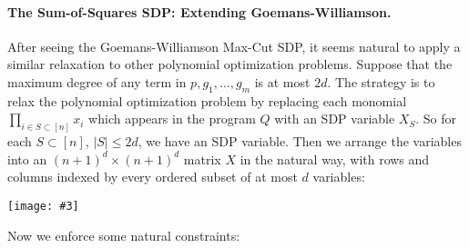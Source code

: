\documentclass[a4paper,11pt]{article}
\theoremstyle{definition}
\def\image#1#2#3{\begin{center}\texttt{[image: \#3]}\end{center}}
\begin{document}
\paragraph{The Sum-of-Squares SDP: Extending Goemans-Williamson.}
After seeing the Goemans-Williamson Max-Cut SDP, it seems natural to apply a similar relaxation to other polynomial optimization problems.
Suppose that the maximum degree of any term in $p, g_1,\ldots,g_m$ is at most $2d$.
The strategy is to relax the polynomial optimization problem by replacing each monomial $\prod_{i\in S \subset [n]} x_i$ which appears in the program $Q$ with an SDP variable $X_S$.
So for each $S \subset [n]$, $|S| \le 2d$, we have an SDP variable.
Then we arrange the variables into an $(n+1)^d \times (n+1)^d$ matrix $X$ in the natural way, with rows and columns indexed by every ordered subset of at most $d$ variables:
\image{height = 300}{/sources/june2016-sos/sos-X.png}{sos-X.png}
Now we enforce some natural constraints:
\end{document}
